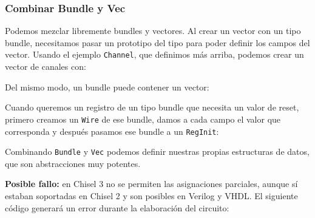 \documentclass[%
    10pt,
    headinclude, footinclude=false,
    openright, %
    notitlepage,
    cleardoublepage=empty,
    headsepline,
    numbers=noenddot,
    bibliography=totoc, index=totoc,
    ]{scrbook}
\newcommand{\code}[1]{{\lstinline[basicstyle=\small\ttfamily]{#1}}}
\begin{document}

\subsubsection{Combinar Bundle y Vec}


Podemos mezclar libremente bundles y vectores. Al crear un vector con un tipo
bundle, necesitamos pasar un prototipo del tipo para poder definir los campos del vector. 
Usando el ejemplo \code{Channel}, que definimos más arriba, podemos crear un vector de canales con:



\noindent Del mismo modo, un bundle puede contener un vector:



Cuando queremos un registro de un tipo bundle que necesita un valor de reset,
primero creamos un \code{Wire} de ese bundle, damos a cada campo el valor
que corresponda y después pasamos ese bundle a un \code{RegInit}:



Combinando \code{Bundle} y \code{Vec} podemos definir nuestras propias estructuras
de datos, que son abstracciones muy potentes.


\textbf{Posible fallo:} en Chisel 3 no se permiten las asignaciones parciales, aunque sí estaban
soportadas en Chisel 2 y son posibles en Verilog y VHDL. El siguiente código generará
un error durante la elaboración del circuito:
\end{document}

